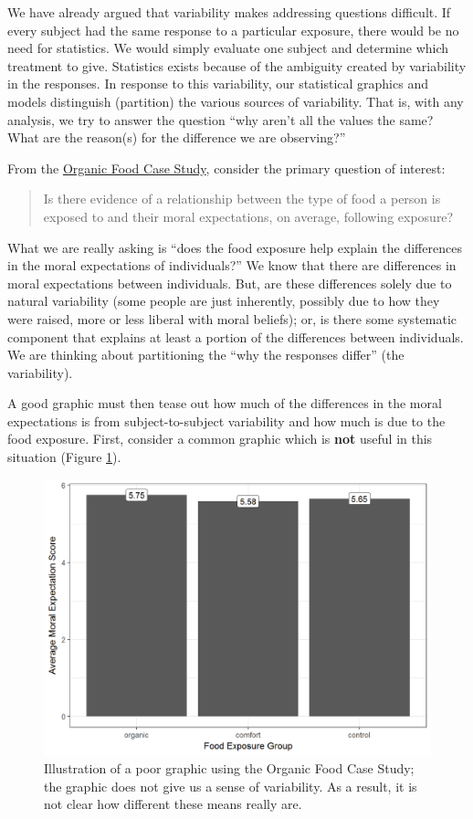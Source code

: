 \documentclass[]{book}
\theoremstyle{definition}
\theoremstyle{definition}
\theoremstyle{remark}
\begin{document}
We have already argued that variability makes addressing questions
difficult. If every subject had the same response to a particular
exposure, there would be no need for statistics. We would simply
evaluate one subject and determine which treatment to give. Statistics
exists because of the ambiguity created by variability in the responses.
In response to this variability, our statistical graphics and models
distinguish (partition) the various sources of variability. That is,
with any analysis, we try to answer the question ``why aren't all the
values the same? What are the reason(s) for the difference we are
observing?''

From the \protect\hyperlink{CaseOrganic}{Organic Food Case Study},
consider the primary question of interest:

\begin{quote}
Is there evidence of a relationship between the type of food a person is
exposed to and their moral expectations, on average, following exposure?
\end{quote}

What we are really asking is ``does the food exposure help explain the
differences in the moral expectations of individuals?'' We know that
there are differences in moral expectations between individuals. But,
are these differences solely due to natural variability (some people are
just inherently, possibly due to how they were raised, more or less
liberal with moral beliefs); or, is there some systematic component that
explains at least a portion of the differences between individuals. We
are thinking about partitioning the ``why the responses differ'' (the
variability).

A good graphic must then tease out how much of the differences in the
moral expectations is from subject-to-subject variability and how much
is due to the food exposure. First, consider a common graphic which is
\textbf{not} useful in this situation (Figure
\ref{fig:anovasummaries-bad-bar}).

\begin{figure}

{\centering \includegraphics[width=0.8\linewidth]{./Images/anovasummaries-bad-bar-1} 

}

\caption{Illustration of a poor graphic using the Organic Food Case Study; the graphic does not give us a sense of variability.  As a result, it is not clear how different these means really are.}\label{fig:anovasummaries-bad-bar}
\end{figure}
\end{document}
